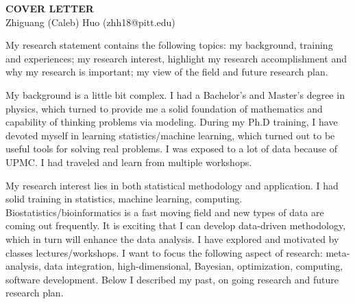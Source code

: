 \documentclass[a4paper, 10pt]{article}
\begin{document}
\thispagestyle{fancy}
\lhead{}
\rhead{}
\renewcommand{\headrulewidth}{0pt} 
\renewcommand{\footrulewidth}{0pt} 
\fancyfoot[C]{\footnotesize \textcolor{gray}{http://www.stanford.edu/$\sim$sundaes/application}} 


\pagestyle{fancy}
\lhead{\textcolor{gray}{\it Zhiguang (Caleb) Huo}}
\rhead{\textcolor{gray}{\thepage/\totalpages{}}}


\begin{center}
{\LARGE \bf COVER LETTER}\\
\vspace*{0.1cm}
{\normalsize Zhiguang (Caleb) Huo (zhh18@pitt.edu)}
\end{center}

My research statement contains the following topics: my background, training and experiences;
my research interest, highlight my research accomplishment and why my research is important;
my view of the field and future research plan.

My background is a little bit complex. 
I had a Bachelor's and Master's degree in physics, 
which turned to provide me a solid foundation of mathematics and capability of thinking problems via modeling.
During my Ph.D training, 
I have devoted myself in learning statistics/machine learning, which turned out to be useful tools for solving real problems.
I was exposed to a lot of data because of UPMC.
I had traveled and learn from multiple workshops.


My research interest lies in both statistical methodology and application.
I had solid training in statistics, machine learning, computing.
Biostatistics/bioinformatics is a fast moving field and new types of data are coming out frequently.
It is exciting that I can develop data-driven methodology, which in turn will enhance the data analysis.
I have explored and motivated by classes lectures/workshops.
I want to focus the following aspect of research:
meta-analysis, data integration, high-dimensional, Bayesian, optimization, computing, software development.
Below I described my past, on going research and future research plan.
\end{document}

